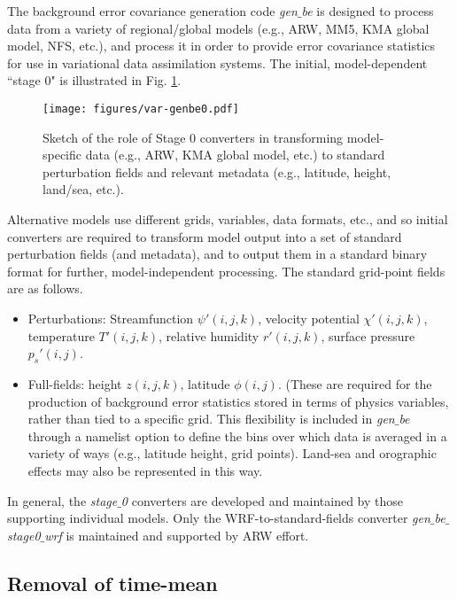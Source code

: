 The background error covariance generation code {\it gen$\_$be} is designed to process
data from a variety of regional/global models (e.g., ARW, MM5, KMA global model, 
NFS, etc.), and process it in order to provide error 
covariance statistics for use in variational data assimilation systems. The initial, 
model-dependent ``stage 0" is illustrated in Fig. \ref{var-genbe0}. 

%
%
\begin{figure}
  \centering
  \texttt{[image: figures/var-genbe0.pdf]}
  \caption{\label{var-genbe0}Sketch of the role of Stage 0 converters 
  in transforming model-specific data (e.g., ARW, KMA global model, etc.) to standard 
  perturbation fields and relevant metadata (e.g., latitude, height, land/sea, etc.).}
\end{figure}

Alternative models use different grids, variables, data formats, etc., and so initial converters 
are required to transform model output into a set of standard perturbation fields (and metadata), 
and to output them in a standard binary format for further, model-independent processing. The 
standard grid-point fields are as follows.

\begin{itemize}\setlength{\parskip}{-4pt}
\item
 	Perturbations: Streamfunction $\psi'(i,j,k)$, velocity potential $\chi'(i,j,k)$, 
temperature $T'(i,j,k)$, relative humidity $r'(i,j,k)$, surface pressure $p_s'(i,j)$.

\item
 	Full-fields: height $z(i,j,k)$, latitude $\phi(i,j)$. (These are required for the 
production of background error statistics stored in terms of physics variables, 
rather than tied to a specific grid. This flexibility is included in {\it gen$\_$be} through a 
namelist option to define the bins over which data is averaged in a variety of ways 
(e.g., latitude height, grid points). Land-sea and orographic effects may also be 
represented in this way.
\end{itemize}

In general, the {\it stage$\_$0} converters are developed and maintained by those supporting
individual models. Only the WRF-to-standard-fields converter {\it gen$\_$be$\_$stage0$\_$wrf} 
is maintained and supported by ARW effort.

\subsection{Removal of time-mean}

